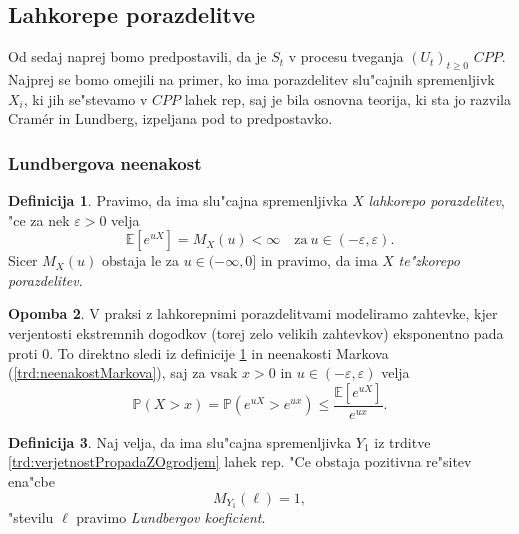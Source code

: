 \documentclass[12pt, a4paper, reqno]{amsart}
\theoremstyle{definition}
\newtheorem{definicija}{Definicija}[section]
\newtheorem{opomba}[definicija]{Opomba}
\theoremstyle{plain}
\newcommand{\E}{\mathbb{E}}
\newcommand{\Prob}{\mathbb{P}}
\newcommand{\1}{\mathds{1}}
\begin{document}
    \subsection{Lahkorepe porazdelitve}
        Od sedaj naprej bomo predpostavili, da je $S_t$ v procesu tveganja $(U_t)_{t\geq0}$ $CPP$.
        Najprej se bomo omejili na primer, ko ima porazdelitev slu"cajnih spremenljivk $X_i$, ki jih 
        se"stevamo v $CPP$ lahek rep, saj je bila osnovna teorija, ki sta jo razvila Cramér in Lundberg,
        izpeljana pod to predpostavko.
        \subsubsection{Lundbergova neenakost}
            \begin{definicija}
                Pravimo, da ima slu"cajna spremenljivka $X$ \textit{lahkorepo porazdelitev}, "ce za 
                nek $\varepsilon > 0$ velja
            \begin{equation*}
                \E\left[e^{uX}\right] = M_X(u) < \infty \quad \text{za} \ u \in (-\varepsilon, \varepsilon).
            \end{equation*}
            Sicer $M_X(u)$ obstaja le za $u\in(-\infty, 0]$ in pravimo, 
            da ima $X$ \textit{te"zkorepo porazdelitev}.
            \label{def:lahkorepnaPorazdelitev}
            \end{definicija}

            \begin{opomba}
                V praksi z lahkorepnimi porazdelitvami modeliramo zahtevke, kjer verjentosti ekstremnih 
                dogodkov (torej zelo velikih zahtevkov) eksponentno pada proti $0$. To direktno sledi iz 
                definicije \ref{def:lahkorepnaPorazdelitev} in neenakosti Markova (\ref{trd:neenakostMarkova}), 
                saj za vsak 
                $x>0$ in $u\in(-\varepsilon, \varepsilon)$ velja
                \begin{equation*}
                    \Prob\left(X > x\right) = \Prob\left(e^{uX} > e^{ux}\right) \leq \frac{\E\left[e^{uX}\right]}{e^{ux}}.
                \end{equation*}
                \label{op:lahkorepnaPorazdelitev}
            \end{opomba}

            \begin{definicija}
                Naj velja, da ima slu"cajna spremenljivka $Y_1$ iz trditve \ref{trd:verjetnostPropadaZOgrodjem} 
                lahek rep. "Ce obstaja pozitivna re"sitev ena"cbe
                \begin{equation*}
                    M_{Y_1}(\ell)  = 1,
                \end{equation*}
                "stevilu $\ell$ pravimo \textit{Lundbergov koeficient}.
                \label{def:LundbergovKoeficient}
            \end{definicija}
\end{document}
